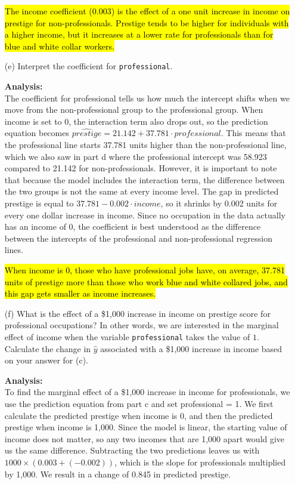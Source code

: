 \documentclass[12pt,letterpaper]{article}
\begin{document}
\begin{enumerate}
	\hl{The income coefficient (0.003) is the effect of a one unit increase in income on prestige for non-professionals. Prestige tends to be higher for individuals with a higher income, but it increases at a lower rate for professionals than for blue and white collar workers.}
	
	\item [(e)]
	Interpret the coefficient for \texttt{professional}.
	
	\textbf{Analysis:}\\
	The coefficient for professional tells us how much the intercept shifts when we move from the non-professional group to the professional group. When income is set to 0, the interaction term also drops out, so the prediction equation becomes $\widehat{prestige} = 21.142 + 37.781 \cdot professional$. This means that the professional line starts 37.781 units higher than the non-professional line, which we also saw in part d where the professional intercept was 58.923 compared to 21.142 for non-professionals. However, it is important to note that because the model includes the interaction term, the difference between the two groups is not the same at every income level. The gap in predicted prestige is equal to $37.781 - 0.002 \cdot income$, so it shrinks by 0.002 units for every one dollar increase in income. Since no occupation in the data actually has an income of 0, the coefficient is best understood as the difference between the intercepts of the professional and non-professional regression lines. 
	
	\hl{When income is 0, those who have professional jobs have, on average, 37.781 units of prestige more than those who work blue and white collared jobs, and this gap gets smaller as income increases.}
		
	\item [(f)]
	What is the effect of a \$1,000 increase in income on prestige score for professional occupations? In other words, we are interested in the marginal effect of income when the variable \texttt{professional} takes the value of $1$. Calculate the change in $\hat{y}$ associated with a \$1,000 increase in income based on your answer for (c).
	
	
	
	
	\textbf{Analysis:}\\
	To find the marginal effect of a \$1,000 increase in income for professionals, we use the prediction equation from part c and set professional = 1. We first calculate the predicted prestige when income is 0, and then the predicted prestige when income is 1,000. Since the model is linear, the starting value of income does not matter, so any two incomes that are 1,000 apart would give us the same difference. Subtracting the two predictions leaves us with $1000 \times (0.003 + (-0.002))$, which is the slope for professionals multiplied by 1,000. We result in a change of 0.845 in predicted prestige. 
	

\end{enumerate}
\end{document}
